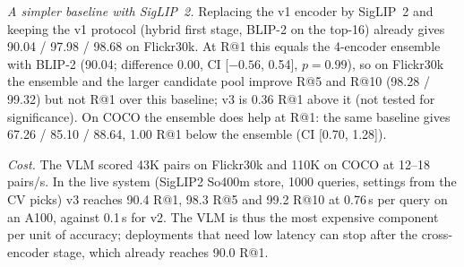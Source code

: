 \documentclass[conference]{IEEEtran}
\begin{document}
\emph{A simpler baseline with SigLIP~2.} Replacing the v1 encoder by SigLIP~2 and keeping the v1 protocol
(hybrid first stage, BLIP-2 on the top-16) already gives 90.04 / 97.98 / 98.68 on Flickr30k. At R@1 this equals
the 4-encoder ensemble with BLIP-2 (90.04; difference 0.00, CI [$-0.56$, 0.54], $p=0.99$), so on Flickr30k the
ensemble and the larger candidate pool improve R@5 and R@10 (98.28 / 99.32) but not R@1 over this baseline; v3 is
0.36 R@1 above it (not tested for significance). On COCO the ensemble does help at R@1: the same baseline gives
67.26 / 85.10 / 88.64, 1.00 R@1 below the ensemble (CI [0.70, 1.28]).

\emph{Cost.} The VLM scored 43K pairs on Flickr30k and 110K on COCO at 12--18 pairs/s. In the live system
(SigLIP2 So400m store, 1000 queries, settings from the CV picks) v3 reaches 90.4 R@1, 98.3 R@5 and 99.2 R@10 at
0.76\,s per query on an A100, against 0.1\,s for v2. The VLM is thus the most expensive component per unit of
accuracy; deployments that need low latency can stop after the cross-encoder stage, which already reaches 90.0 R@1.
\end{document}
